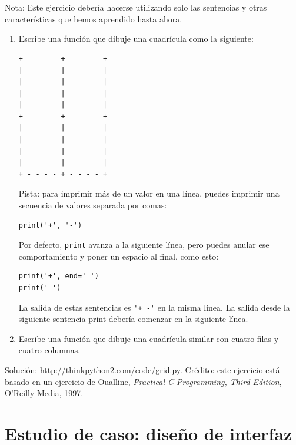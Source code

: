\documentclass[10pt]{book}
\begin{document}
\begin{exercise}

Nota: Este ejercicio debería hacerse
utilizando solo las sentencias y otras características que hemos aprendido hasta
ahora.

\begin{enumerate}

\item Escribe una función que dibuje una cuadrícula como la siguiente:
\newpage
\begin{verbatim}
+ - - - - + - - - - +
|         |         |
|         |         |
|         |         |
|         |         |
+ - - - - + - - - - +
|         |         |
|         |         |
|         |         |
|         |         |
+ - - - - + - - - - +
\end{verbatim}
%
Pista: para imprimir más de un valor en una línea, puedes imprimir
una secuencia de valores separada por comas:

\begin{verbatim}
print('+', '-')
\end{verbatim}
%
Por defecto, {\tt print} avanza a la siguiente línea, pero
puedes anular ese comportamiento y poner un espacio al final, como esto:

\begin{verbatim}
print('+', end=' ')
print('-')
\end{verbatim}
%
La salida de estas sentencias es \verb"'+ -'" en la misma línea.
La salida desde la siguiente sentencia print debería comenzar en la siguiente línea.

\item Escribe una función que dibuje una cuadrícula similar
con cuatro filas y cuatro columnas.

\end{enumerate}

Solución: \url{http://thinkpython2.com/code/grid.py}.
Crédito: este ejercicio está basado en un ejercicio de Oualline, {\em
    Practical C Programming, Third Edition}, O'Reilly Media, 1997.

\end{exercise}





\chapter{Estudio de caso: diseño de interfaz}
\label{turtlechap}
\end{document}
